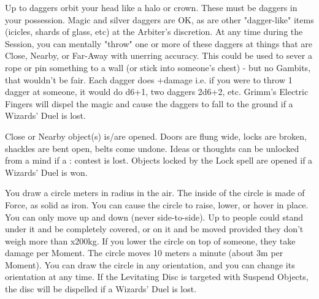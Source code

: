 {Up to \DICE daggers orbit your head like a halo or crown.  These must be
daggers in your possession.  Magic and silver daggers are OK, as are other
"dagger-like" items (icicles, shards of glass, etc) at the Arbiter's
discretion.  At any time during the Session, you can mentally "throw" one or
more of these daggers at things that are Close, Nearby, or Far-Away with
unerring accuracy.  This could be used to sever a rope or pin something to a
wall (or stick into someone's chest) - but no Gambits, that wouldn't be
fair.  Each dagger does \SUMDICE+\DICE damage i.e. if you were to throw 1
dagger at someone, it would do d6+1, two daggers 2d6+2, etc.  Grimm's
Electric Fingers will dispel the magic and cause the daggers to fall to the
ground if a Wizards' Duel is lost.





\SPELL[
  Name=Knock,
  Link=wizardry-knock,
  Paradigm=Entropy,
  Save=N,
  Duration=0,
  Counter=\mylink{Lock}{wizardry-lock} ,
  Keywords=None,
  Target=Close or Nearby Objects
]



\DICE Close or Nearby object(s) is/are opened. Doors are flung wide, locks
are broken, shackles are bent open, belts come undone.  Ideas or thoughts
can be unlocked from a mind if a \RB : \INT contest is lost. Objects locked
by the Lock spell are opened if a Wizards' Duel is won.




\SPELL[
  Name=Levitating Disc,
  Link=wizardry-levitating-disc,
  Paradigm=Force,
  Save=N,
  Duration=Concentration,
  Counter=\mylink{Suspend Objects}{wizardry-suspend-objects} ,
  Keywords=None,
  Target=Close or Nearby point in space
]



You draw a circle \DICE meters in radius in the air. The inside of the
circle is made of Force, as solid as iron. You can cause the circle to
raise, lower, or hover in place.  You can only move up and down (never
side-to-side).  Up to \DICE people could stand under it and be completely
covered, or on it and be moved provided they don't weigh more than \DICE
x200kg.  If you lower the circle on top of someone, they take \DICE damage
per Moment. The circle moves 10 meters a minute (about 3m per Moment).  You
can draw the circle in any orientation, and you can change its orientation
at any time.  If the Levitating Disc is targeted with Suspend Objects, the
disc will be dispelled if a Wizards' Duel is lost.





}
